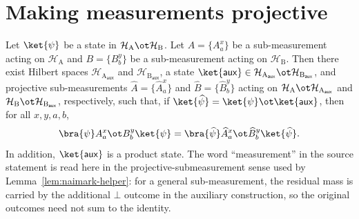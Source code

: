 \chapter{Making measurements projective}
\label{chap:projective}

\begin{theorem}\label{thm:naimark}
	\leanok
	Let $\ket{\psi}$ be a state in $\mathcal H_{\mathrm A} \ot \mathcal H_{\mathrm B}$.
	Let $A = \{A^x_a\}$ be a sub-measurement acting on $\mathcal H_{\mathrm A}$
	and $B=\{B^y_b\}$ be a sub-measurement acting on $\mathcal H_{\mathrm B}$.
	Then there exist Hilbert spaces $\mathcal H_{\mathrm A_{\mathsf{aux}}}$ and $\mathcal H_{\mathrm B_{\mathsf{aux}}}$,
	a state $\ket{\mathsf{aux}} \in \mathcal H_{\mathrm A_{\mathsf{aux}}} \ot \mathcal H_{\mathrm B_{\mathsf{aux}}}$,
	and projective sub-measurements $\widehat{A} = \{\widehat{A}^x_a\}$ and $\widehat{B}=\{\widehat{B}^y_b\}$
	acting on $\mathcal H_{\mathrm A} \ot \mathcal H_{\mathrm A_{\mathsf{aux}}}$
	and $\mathcal H_{\mathrm B} \ot \mathcal H_{\mathrm B_{\mathsf{aux}}}$, respectively,
	such that, if $\ket{\widehat{\psi}} = \ket{\psi} \ot \ket{\mathsf{aux}}$, then for all $x,y,a,b$,
	\[
		\bra{\psi} A^x_a \ot B^y_b \ket{\psi}
		=
		\bra{\widehat{\psi}} \widehat{A}^x_a \ot \widehat{B}^y_b \ket{\widehat{\psi}}.
	\]
	In addition, $\ket{\mathsf{aux}}$ is a product state.
	The word ``measurement'' in the source statement is read here in the
	projective-submeasurement sense used by Lemma~\ref{lem:naimark-helper}: for a
	general sub-measurement, the residual mass is carried by the additional
	\(\bot\) outcome in the auxiliary construction, so the original outcomes need
	not sum to the identity.
\end{theorem}
